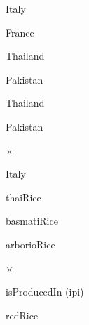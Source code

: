 \documentclass[a4paper,portrait,12pt]{article}
\begin{document}
\begin{flushleft}
Italy
\end{flushleft}


\begin{flushleft}
France
\end{flushleft}


\begin{flushleft}
Thailand
\end{flushleft}


\begin{flushleft}
Pakistan
\end{flushleft}


\begin{flushleft}
Thailand
\end{flushleft}





\begin{flushleft}
Pakistan
\end{flushleft}





×





\begin{flushleft}
Italy
\end{flushleft}





\begin{flushleft}
thaiRice
\end{flushleft}





\begin{flushleft}
basmatiRice
\end{flushleft}





\begin{flushleft}
arborioRice
\end{flushleft}


×





\begin{flushleft}
isProducedIn (ipi)
\end{flushleft}


\begin{flushleft}
redRice
\end{flushleft}
\end{document}
